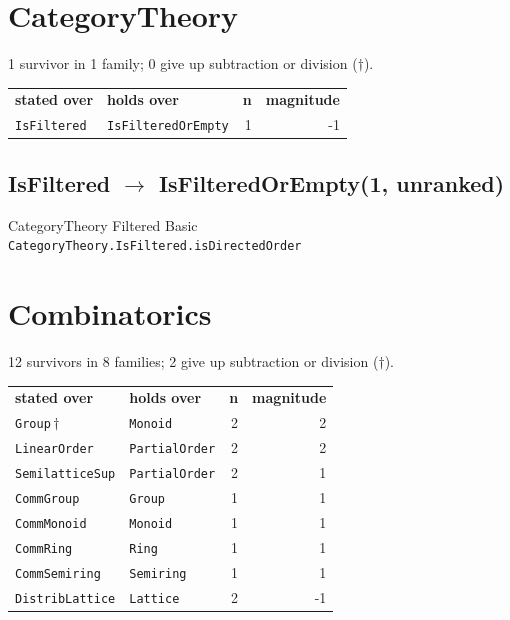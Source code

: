 \documentclass[10pt,a4paper]{article}
\begin{document}
\bigskip
\section{CategoryTheory}
1 survivor in 1 family; 0 give up subtraction or division ($\dagger$).

\begin{center}
\begin{tabular}{llrr}
\textbf{stated over} & \textbf{holds over} & \textbf{n} & \textbf{magnitude}\\[2pt]
\texttt{\small IsFiltered} & \texttt{\small IsFilteredOrEmpty} & 1 & -1\\
\end{tabular}
\end{center}

\subsection*{IsFiltered $\to$ IsFilteredOrEmpty\quad\textmd{\small (1, unranked)}}
{\footnotesize\color{locator}CategoryTheory\,\textperiodcentered\,Filtered\,\textperiodcentered\,Basic}\\
\hspace*{1em}\texttt{\small CategoryTheory.\allowbreak{}IsFiltered.\allowbreak{}isDirectedOrder}\\

\clearpage
\section{Combinatorics}
12 survivors in 8 families; 2 give up subtraction or division ($\dagger$).

\begin{center}
\begin{tabular}{llrr}
\textbf{stated over} & \textbf{holds over} & \textbf{n} & \textbf{magnitude}\\[2pt]
\texttt{\small Group}\,$\dagger$ & \texttt{\small Monoid} & 2 & 2\\
\texttt{\small LinearOrder} & \texttt{\small PartialOrder} & 2 & 2\\
\texttt{\small SemilatticeSup} & \texttt{\small PartialOrder} & 2 & 1\\
\texttt{\small CommGroup} & \texttt{\small Group} & 1 & 1\\
\texttt{\small CommMonoid} & \texttt{\small Monoid} & 1 & 1\\
\texttt{\small CommRing} & \texttt{\small Ring} & 1 & 1\\
\texttt{\small CommSemiring} & \texttt{\small Semiring} & 1 & 1\\
\texttt{\small DistribLattice} & \texttt{\small Lattice} & 2 & -1\\
\end{tabular}
\end{center}
\end{document}

